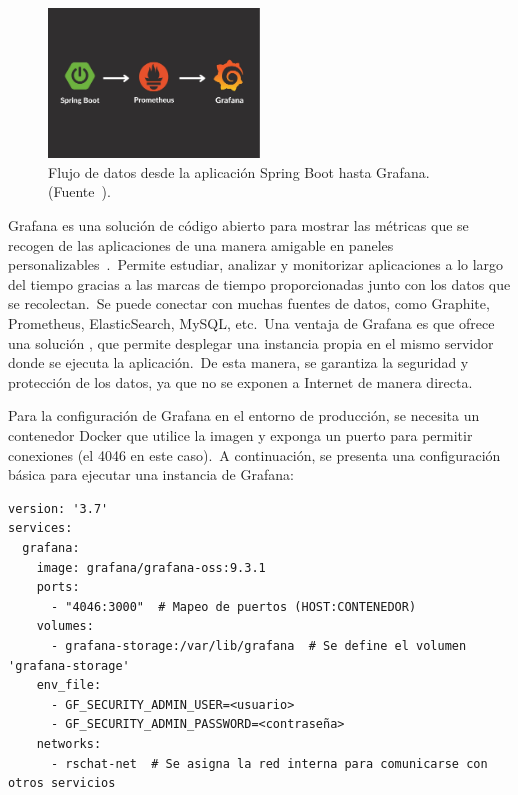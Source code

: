 \begin{figure}[H]
	\centering
	\includegraphics[width=0.5\textwidth]{res/images/cover}
	\caption{Flujo de datos desde la aplicación Spring Boot hasta Grafana. (Fuente~\cite{prometheus-flow}).}
	\label{fig:prometheus-flow}
\end{figure}

Grafana es una solución de código abierto para mostrar las métricas que se recogen de las aplicaciones de una
manera amigable en paneles personalizables~\cite{what-is-grafana}.\ Permite estudiar, analizar y monitorizar
aplicaciones a lo largo del tiempo gracias a las marcas de tiempo proporcionadas junto con los datos que se
recolectan.\ Se puede conectar con muchas fuentes de datos, como Graphite, Prometheus, ElasticSearch, MySQL, etc.\
Una ventaja de Grafana es que ofrece una solución , que permite desplegar una instancia propia en
el mismo servidor donde se ejecuta la aplicación.\ De esta manera, se garantiza la seguridad y protección de los
datos, ya que no se exponen a Internet de manera directa.

Para la configuración de Grafana en el entorno de producción, se necesita un contenedor Docker que utilice la imagen
\monoFont{grafana/grafana-oss} y exponga un puerto para permitir conexiones (el 4046 en este caso).\ A continuación,
se presenta una configuración básica para ejecutar una instancia de Grafana:

\begin{codeBlock}
	\begin{verbatim}
version: '3.7'
services:
  grafana:
    image: grafana/grafana-oss:9.3.1
    ports:
      - "4046:3000"  # Mapeo de puertos (HOST:CONTENEDOR)
    volumes:
      - grafana-storage:/var/lib/grafana  # Se define el volumen 'grafana-storage'
    env_file:
      - GF_SECURITY_ADMIN_USER=<usuario>
      - GF_SECURITY_ADMIN_PASSWORD=<contraseña>
    networks:
      - rschat-net  # Se asigna la red interna para comunicarse con otros servicios
	\end{verbatim}
	\caption{Configuración mínima para ejecutar un contenedor con Grafana.}
	\label{cod:grafana-docker-compose}
\end{codeBlock}

